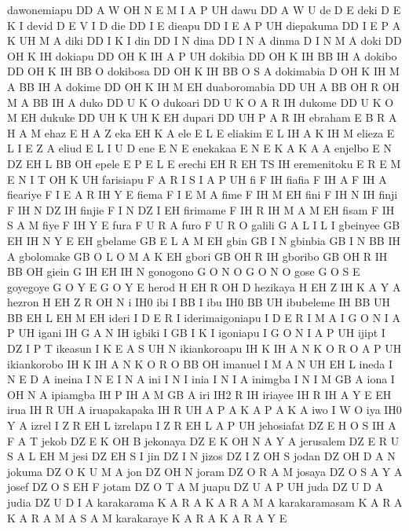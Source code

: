   dawonemiapu DD A W OH N E M I A P UH
  dawu DD A W U
  de D E
  deki D E K I
  devid D E V I D
  die DD I E
  dieapu DD I E A P UH
  diepakuma DD I E P A K UH M A
  diki DD I K I
  din DD I N
  dina DD I N A
  dinma D I N M A
  doki DD OH K IH
  dokiapu DD OH K IH A P UH
  dokibia DD OH K IH BB IH A
  dokibo DD OH K IH BB O
  dokibosa DD OH K IH BB O S A
  dokimabia D OH K IH M A BB IH A
  dokime DD OH K IH M EH
  duaboromabia DD UH A BB OH R OH M A BB IH A
  duko DD U K O
  dukoari DD U K O A R IH
  dukome DD U K O M EH
  dukuke DD UH K UH K EH
  dupari DD UH P A R IH
  ebraham E B R A H A M
  ehaz E H A Z
  eka EH K A
  ele E L E
  eliakim E L IH A K IH M
  elieza E L I E Z A
  eliud E L I U D
  ene E N E
  enekakaa E N E K A K A A
  enjelbo E N DZ EH L BB OH
  epele E P E L E
  erechi EH R EH TS IH
  eremenitoku E R E M E N I T OH K UH
  farisiapu F A R I S I A P UH
  fi F IH
  fiafia F IH A F IH A
  fieariye F I E A R IH Y E
  fiema F I E M A
  fime F IH M EH
  fini F IH N IH
  finji F IH N DZ IH
  finjie F I N DZ I EH
  firimame F IH R IH M A M EH
  fisam F IH S A M
  fiye F IH Y E
  fura F U R A
  furo F U R O
  galili G A L I L I
  gbeinyee GB EH IH N Y E EH
  gbelame GB E L A M EH
  gbin GB I N
  gbinbia GB I N BB IH A
  gbolomake GB O L O M A K EH
  gbori GB OH R IH
  gboribo GB OH R IH BB OH
  giein G IH EH IH N
  gonogono G O N O G O N O
  gose G O S E
  goyegoye G O Y E G O Y E
  herod H EH R OH D
  hezikaya H EH Z IH K A Y A
  hezron H EH Z R OH N
  i IH0
  ibi I BB I
  ibu IH0 BB UH
  ibubeleme IH BB UH BB EH L EH M EH
  ideri I D E R I
  iderimaigoniapu I D E R I M A I G O N I A P UH
  igani IH G A N IH
  igbiki I GB I K I
  igoniapu I G O N I A P UH
  ijipt I DZ I P T
  ikeasun I K E A S UH N
  ikiankoroapu IH K IH A N K O R O A P UH
  ikiankorobo IH K IH A N K O R O BB OH
  imanuel I M A N UH EH L
  ineda I N E D A
  ineina I N E I N A
  ini I N I
  inia I N I A
  inimgba I N I M GB A
  iona I OH N A
  ipiamgba IH P IH A M GB A
  iri IH2 R IH
  iriayee IH R IH A Y E EH
  irua IH R UH A
  iruapakapaka IH R UH A P A K A P A K A
  iwo I W O
  iya IH0 Y A
  izrel I Z R EH L
  izrelapu I Z R EH L A P UH
  jehosiafat DZ E H O S IH A F A T
  jekob DZ E K OH B
  jekonaya DZ E K OH N A Y A
  jerusalem DZ E R U S A L EH M
  jesi DZ EH S I
  jin DZ I N
  jizos DZ I Z OH S
  jodan DZ OH D A N
  jokuma DZ O K U M A
  jon DZ OH N
  joram DZ O R A M
  josaya DZ O S A Y A
  josef DZ O S EH F
  jotam DZ O T A M
  juapu DZ U A P UH
  juda DZ U D A
  judia DZ U D I A
  karakarama K A R A K A R A M A
  karakaramasam K A R A K A R A M A S A M
  karakaraye K A R A K A R A Y E
